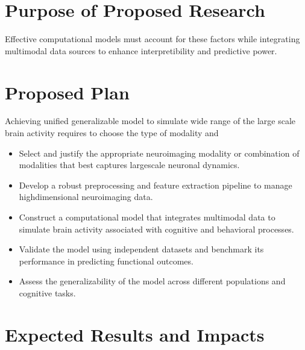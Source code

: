 \documentclass[letterpaper,10pt,english]{sphinxmanual}
\begin{document}
\section{Purpose of Proposed Research}
\label{\detokenize{Project Proposal:purpose-of-proposed-research}}
\sphinxAtStartPar
Effective  computational models must account for these factors while integrating multimodal data sources to enhance interpretibility and
predictive power.


\section{Proposed Plan}
\label{\detokenize{Project Proposal:proposed-plan}}
\sphinxAtStartPar
Achieving unified generalizable model to simulate wide range of the large scale brain activity requires to choose the
type of modality and
\begin{itemize}
\item {} 
\sphinxAtStartPar
{} Select and justify the appropriate neuroimaging modality or combination of modalities that best captures large\sphinxhyphen{}scale neuronal dynamics.

\item {} 
\sphinxAtStartPar
{} Develop a robust preprocessing and feature extraction pipeline to manage high\sphinxhyphen{}dimensional neuroimaging data.

\item {} 
\sphinxAtStartPar
{} Construct a computational model that integrates multi\sphinxhyphen{}modal data to simulate brain activity associated with cognitive and behavioral processes.

\item {} 
\sphinxAtStartPar
{} Validate the model using independent datasets and benchmark its performance in predicting functional outcomes.

\item {} 
\sphinxAtStartPar
{} Assess the generalizability of the model across different populations and cognitive tasks.

\end{itemize}


\section{Expected Results and Impacts}
\label{\detokenize{Project Proposal:expected-results-and-impacts}}
\sphinxstepscope
\end{document}

